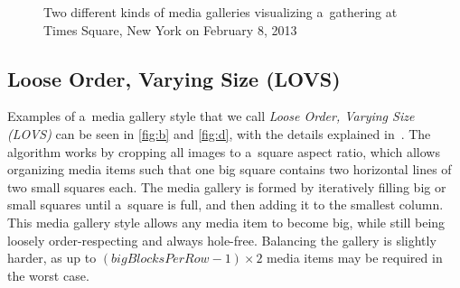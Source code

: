 \documentclass{sig-alternate}
\begin{document}
\begin{figure}[t!]
  \centering
  \caption{Two different kinds of media galleries visualizing a~gathering at Times Square, New York on February 8, 2013}
  \label{fig:media-gallery}  
\end{figure}

\subsection{Loose Order, Varying Size (LOVS)}

Examples of a~media gallery style
that we call \emph{Loose Order, Varying Size (LOVS)}
can be seen in \autoref{fig:b} and \autoref{fig:d},
with the details explained in~\cite{chedeau2012facebook}.
The algorithm works by cropping all images to a~square aspect ratio,
which allows organizing media items such that one big square
contains two horizontal lines of two small squares each.
The media gallery is formed by iteratively filling
big or small squares until a~square is full,
and then adding it to the smallest column.
This media gallery style allows any media item to become big,
while still being loosely order-respecting and always hole-free.
Balancing the gallery is slightly harder,
as up to $ (\mathit{bigBlocksPerRow} - 1) \times 2 $ media items
may be required in the worst case.
\end{document}
